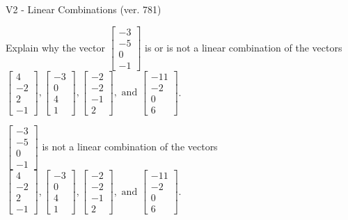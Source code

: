 \begin{exercise}
  \begin{exerciseTitle}V2 - Linear Combinations (ver. 781)\end{exerciseTitle}
  \begin{exerciseStatement}
    Explain why the vector \(\left[\begin{array}{c}
-3 \\
-5 \\
0 \\
-1
\end{array}\right]\)  is or is not a linear 
	combination of the vectors \(\left[\begin{array}{c}
4 \\
-2 \\
2 \\
-1
\end{array}\right] , \left[\begin{array}{c}
-3 \\
0 \\
4 \\
1
\end{array}\right] , \left[\begin{array}{c}
-2 \\
-2 \\
-1 \\
2
\end{array}\right] , \text{ and } \left[\begin{array}{c}
-11 \\
-2 \\
0 \\
6
\end{array}\right]\).
	


  \end{exerciseStatement}
  \begin{exerciseAnswer}
   \(\left[\begin{array}{c}
-3 \\
-5 \\
0 \\
-1
\end{array}\right]\) 
  	 is not  
	a linear combination of the vectors \(\left[\begin{array}{c}
4 \\
-2 \\
2 \\
-1
\end{array}\right] , \left[\begin{array}{c}
-3 \\
0 \\
4 \\
1
\end{array}\right] , \left[\begin{array}{c}
-2 \\
-2 \\
-1 \\
2
\end{array}\right] , \text{ and } \left[\begin{array}{c}
-11 \\
-2 \\
0 \\
6
\end{array}\right]\).


\end{exerciseAnswer}
\end{exercise}

